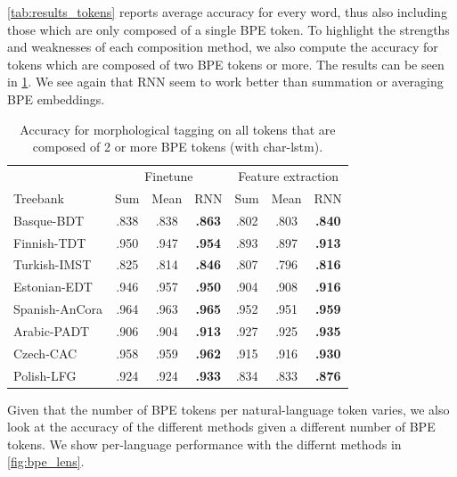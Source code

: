 \documentclass[11pt]{article}
\begin{document}
    \cref{tab:results_tokens} reports average accuracy for every word,
     thus also including those which are only composed of a single BPE
     token. To highlight the strengths and weaknesses of each
     composition method, we also compute the accuracy for tokens which
     are composed of two BPE tokens or more. The results can be seen
     in \cref{tab:results_large_tokens}.  We see again that RNN seem
     to work better than summation or averaging BPE embeddings.

    
	\begin{table}[h]
	\centering
	\begin{tabular}{l|ccc|ccc}
		 & \multicolumn{3}{c}{Finetune} & \multicolumn{3}{c}{Feature extraction} \\
		Treebank & Sum & Mean & RNN & Sum & Mean & RNN  \\
		 \hline
        Basque-BDT      & .838 & .838 & \textbf{.863} & .802 & .803 & \textbf{.840} \\
		Finnish-TDT     & .950 & .947 & \textbf{.954} & .893 & .897 & \textbf{.913} \\ 
		Turkish-IMST    & .825 & .814 & \textbf{.846} & .807 & .796 & \textbf{.816} \\
		Estonian-EDT    & .946 & .957 & \textbf{.950} & .904 & .908 & \textbf{.916} \\
		Spanish-AnCora  & .964 & .963 & \textbf{.965} & .952 & .951 & \textbf{.959} \\
		Arabic-PADT     & .906 & .904 & \textbf{.913} & .927 & .925 & \textbf{.935}\\
		Czech-CAC       & .958 & .959 & \textbf{.962} & .915 & .916 & \textbf{.930} \\
		Polish-LFG      & .924 & .924 & \textbf{.933} & .834 & .833 & \textbf{.876} \\
	\end{tabular}
	\caption{\label{tab:results_large_tokens} Accuracy for morphological tagging on all tokens that are composed of 2 or more BPE tokens (with char-lstm).}
\end{table}

    
    Given that the number of BPE tokens per natural-language token
     varies, we also look at the accuracy of the different methods
     given a different number of BPE tokens. We show per-language
     performance with the differnt methods in \cref{fig:bpe_lens}.
\end{document}

